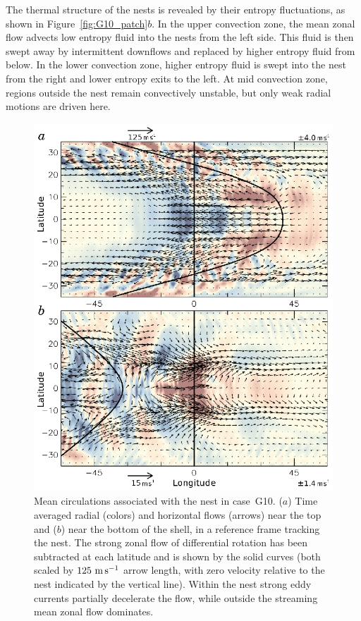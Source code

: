 The thermal structure of the nests is revealed by their entropy
fluctuations, as shown in Figure~\ref{fig:G10_patch}$b$.  In the upper
convection zone, the mean zonal flow advects low entropy fluid into
the nests from the left side.  This fluid is then swept away by
intermittent downflows and replaced by higher
entropy fluid from below.  In the lower convection zone, higher entropy
fluid is swept into the nest from the right and lower entropy exits to
the left.  At mid convection zone, regions outside the nest remain
convectively unstable, but only weak radial motions are driven here.


 
\begin{figure}
  \begin{center}
    \includegraphics[width=0.8\linewidth]{figs/chapter_4/Figure_18.eps}
  \end{center}
  \caption[Mean circulations associated with the nest in case~G10]
          {Mean circulations associated with the nest in case~G10.  
  ($a$) Time averaged radial (colors) and horizontal flows (arrows)
  near the top and ($b$) near the bottom of the shell, in a reference
  frame tracking the nest.  The strong zonal flow of differential rotation has
  been subtracted at each latitude and 
  is shown by the solid curves (both scaled by
  $125~\mathrm{m}\thinspace \mathrm{s}^{-1}$ arrow length, with zero velocity relative to the
  nest indicated by the vertical line).
  Within the nest strong eddy currents partially decelerate
  the flow, while outside the streaming mean zonal flow dominates. 
  \label{fig:G10_tracked_nest}}
\end{figure}
 

